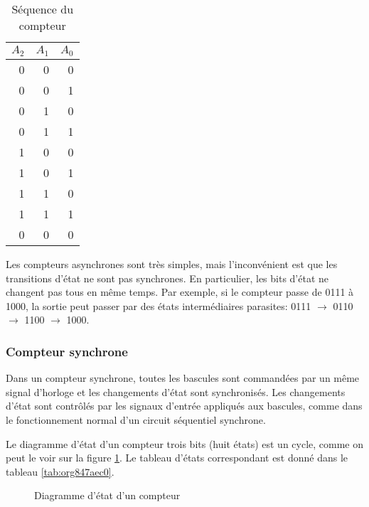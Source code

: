 \documentclass[11pt]{article}
\begin{document}
\begin{table}[htbp]
\caption{\label{tab:orgf920790}Séquence du compteur}
\centering
\begin{tabular}{rrr}
\(A_2\) & \(A_1\) & \(A_0\)\\[0pt]
\hline
0 & 0 & 0\\[0pt]
0 & 0 & 1\\[0pt]
0 & 1 & 0\\[0pt]
0 & 1 & 1\\[0pt]
1 & 0 & 0\\[0pt]
1 & 0 & 1\\[0pt]
1 & 1 & 0\\[0pt]
1 & 1 & 1\\[0pt]
0 & 0 & 0\\[0pt]
\end{tabular}
\end{table}

Les compteurs asynchrones sont très simples, mais l'inconvénient est
que les transitions d'état ne sont pas synchrones. En particulier,
les bits d'état ne changent pas tous en même temps. Par exemple, si le
compteur passe de 0111 à 1000, la sortie peut passer par des états
intermédiaires parasites: 0111 \(\rightarrow\) 0110 \(\rightarrow\) 1100
\(\rightarrow\) 1000.

\subsubsection{Compteur synchrone}
\label{sec:org1d17468}

Dans un compteur synchrone, toutes les bascules sont commandées par un
même signal d'horloge et les changements d'état sont
synchronisés. Les changements d'état sont contrôlés par les signaux
d'entrée appliqués aux bascules, comme dans le fonctionnement normal
d'un circuit séquentiel synchrone.

Le diagramme d'état d'un compteur trois bits (huit états) est un
cycle, comme on peut le voir sur la figure \ref{fig:org581602c}. Le tableau
d'états correspondant est donné dans le tableau \ref{tab:org847aec0}.


\begin{figure}[htbp]
\centering

\caption{\label{fig:org581602c}Diagramme d'état d'un compteur}
\end{figure}
\end{document}
